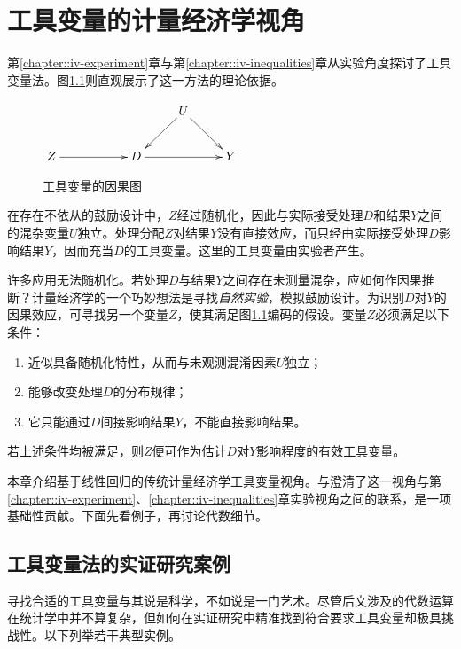  
\chapter{工具变量的计量经济学视角}
 \label{chapter::iv-econometric}
 
 
第\ref{chapter::iv-experiment}章与第\ref{chapter::iv-inequalities}章从实验角度探讨了工具变量法。图\ref{fig::causal-diagram-IV}则直观展示了这一方法的理论依据。 
 
 
\begin{figure}[h]
\centering 
$
\xymatrix{
 && & U  \ar[dl] \ar[dr] &\\
Z \ar[rr] &&D \ar[rr]&&Y
}
$
\caption{工具变量的因果图}\label{fig::causal-diagram-IV}
\end{figure} 
 
 
 
在存在不依从的鼓励设计中，$Z$经过随机化，因此与实际接受处理$D$和结果$Y$之间的混杂变量$U$独立。处理分配$Z$对结果$Y$没有直接效应，而只经由实际接受处理$D$影响结果$Y$，因而充当$D$的工具变量。这里的工具变量由实验者产生。 


许多应用无法随机化。若处理$D$与结果$Y$之间存在未测量混杂，应如何作因果推断？计量经济学的一个巧妙想法是寻找{\it 自然实验}，模拟鼓励设计。为识别$D$对$Y$的因果效应，可寻找另一个变量$Z$，使其满足图\ref{fig::causal-diagram-IV}编码的假设。变量$Z$必须满足以下条件：
\begin{enumerate}
\item
近似具备随机化特性，从而与未观测混淆因素$U$独立；
\item
能够改变处理$D$的分布规律；
\item
它只能通过$D$间接影响结果$Y$，不能直接影响结果。
\end{enumerate}
若上述条件均被满足，则$Z$便可作为估计$D$对$Y$影响程度的有效工具变量。 



本章介绍基于线性回归的传统计量经济学工具变量视角。\citet{imbens1994identification}与\citet{angrist1996identification}澄清了这一视角与第\ref{chapter::iv-experiment}、\ref{chapter::iv-inequalities}章实验视角之间的联系，是一项基础性贡献。下面先看例子，再讨论代数细节。 



\section{工具变量法的实证研究案例}
 
 
 
寻找合适的工具变量与其说是科学，不如说是一门艺术。尽管后文涉及的代数运算在统计学中并不算复杂，但如何在实证研究中精准找到符合要求工具变量却极具挑战性。以下列举若干典型实例。  


